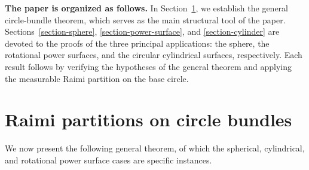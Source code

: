 \documentclass[11pt]{article}
\numberwithin{equation}{section}
\theoremstyle{remark}
\begin{document}
{\bf The paper is organized as follows.}
In Section~\ref{section-main-result}, we establish the general circle-bundle theorem, which serves as the main structural tool of the paper. Sections~\ref{section-sphere}, \ref{section-power-surface}, and \ref{section-cylinder} are devoted to the proofs of the three principal applications: the sphere, the rotational power surfaces, and the circular cylindrical surfaces, respectively.  Each result follows by verifying the hypotheses of the general theorem and applying the measurable Raimi partition on the base circle.





\section{Raimi partitions on circle bundles}\label{section-main-result}


We now present the following general theorem, of which the spherical, cylindrical, and rotational power surface cases are specific instances.
\end{document}
